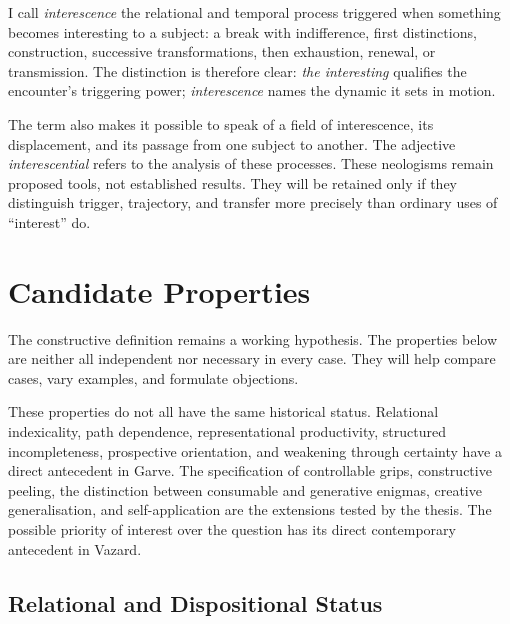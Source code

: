 \documentclass[11pt,a4paper]{article}
\begin{document}
I call \emph{interescence} the relational and temporal process triggered when
something becomes interesting to a subject: a break with indifference, first
distinctions, construction, successive transformations, then exhaustion,
renewal, or transmission. The distinction is therefore clear: \emph{the
interesting} qualifies the encounter's triggering power; \emph{interescence}
names the dynamic it sets in motion.

The term also makes it possible to speak of a field of interescence, its
displacement, and its passage from one subject to another. The adjective
\emph{interescential} refers to the analysis of these processes. These
neologisms remain proposed tools, not established results. They will be retained
only if they distinguish trigger, trajectory, and transfer more precisely than
ordinary uses of ``interest'' do.

\section{Candidate Properties}

The constructive definition remains a working hypothesis. The properties below
are neither all independent nor necessary in every case. They will help compare
cases, vary examples, and formulate objections.

These properties do not all have the same historical status. Relational
indexicality, path dependence, representational productivity, structured
incompleteness, prospective orientation, and weakening through certainty have a
direct antecedent in Garve. The specification of controllable grips,
constructive peeling, the distinction between consumable and generative
enigmas, creative generalisation, and self-application are the extensions tested
by the thesis. The possible priority of interest over the question has its
direct contemporary antecedent in Vazard.

\subsection{Relational and Dispositional Status}
\end{document}
